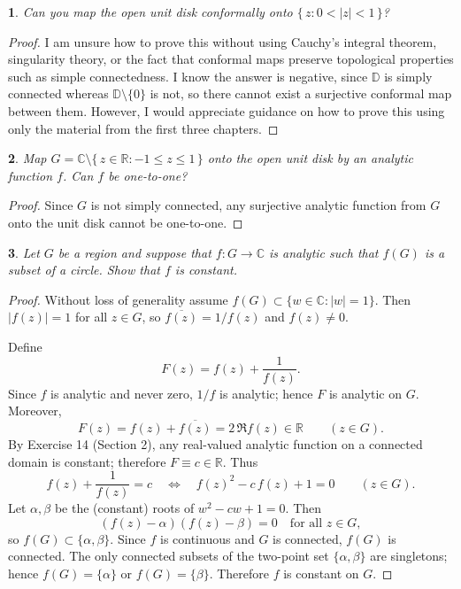 \documentclass[12pt, a4paper]{report}
\theoremstyle{spaced}
\newtheorem{exercise}{}
\newcommand{\setexercise}[1]{\setcounter{exercise}{#1-1}}
\begin{document}
\setexercise{15}
\begin{exercise}
	Can you map the open unit disk conformally onto \(\{\,z: 0<|z|<1\,\}\)?
\end{exercise}

\begin{proof}
	I am unsure how to prove this without using Cauchy’s integral theorem, singularity theory, or the fact that conformal maps preserve topological properties such as simple connectedness. I know the answer is negative, since $\mathbb{D}$ is simply connected whereas $\mathbb{D}\setminus\{0\}$ is not, so there cannot exist a surjective conformal map between them.
	However, I would appreciate guidance on how to prove this using only the material from the first three chapters.
\end{proof}

\par\vspace{15em}


\setexercise{16}
\begin{exercise}
	Map \(G=\mathbb{C}\setminus\{\,z\in\mathbb{R}:-1\le z\le 1\,\}\) onto the open unit disk by an analytic function \(f\).
	Can \(f\) be one-to-one?
\end{exercise}

\begin{proof}
	Since \(G\) is not simply connected, any surjective analytic function from \(G\) onto the unit disk cannot be one-to-one.
\end{proof}


\newpage

\setexercise{17}
\begin{exercise}
	Let \(G\) be a region and suppose that \(f:G\to\mathbb{C}\) is analytic such that \(f(G)\) is a subset of a circle.
	Show that \(f\) is constant.
\end{exercise}

\begin{proof}
	Without loss of generality assume $f(G)\subset\{w\in\mathbb C:|w|=1\}$.
	Then $|f(z)|=1$ for all $z\in G$, so $\overline{f(z)}=1/f(z)$ and $f(z)\neq 0$.

	Define
	\[
		F(z)=f(z)+\frac{1}{f(z)}.
	\]
	Since $f$ is analytic and never zero, $1/f$ is analytic; hence $F$ is analytic on $G$.
	Moreover,
	\[
		F(z)=f(z)+\overline{f(z)}=2\,\Re f(z)\in \mathbb R\qquad(z\in G).
	\]
	By Exercise 14 (Section 2), any real-valued analytic function on a connected domain is constant; therefore $F\equiv c\in\mathbb R$.
	Thus
	\[
		f(z)+\frac{1}{f(z)}=c \quad\Longleftrightarrow\quad f(z)^2-c\,f(z)+1=0\qquad(z\in G).
	\]
	Let $\alpha,\beta$ be the (constant) roots of $w^2-cw+1=0$. Then
	\[
		(f(z)-\alpha)(f(z)-\beta)=0 \quad\text{for all }z\in G,
	\]
	so $f(G)\subset\{\alpha,\beta\}$.
	Since $f$ is continuous and $G$ is connected, $f(G)$ is connected. The only connected subsets of the two-point set $\{\alpha,\beta\}$ are singletons; hence $f(G)=\{\alpha\}$ or $f(G)=\{\beta\}$. Therefore $f$ is constant on $G$.
\end{proof}
\end{document}
